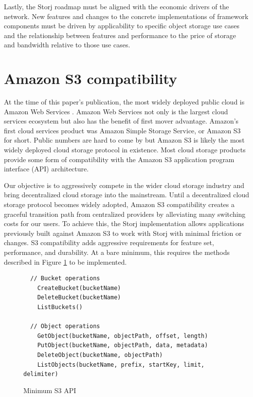 \documentclass[8pt,fleqn,openany]{book}
\begin{document}
Lastly, the Storj roadmap must be aligned with the economic drivers of the
network.
New features and changes to the concrete implementations of framework
components must be driven by applicability to specific object storage use cases
and the relationship between features and performance to the price of storage
and bandwidth relative to those use cases.

\section{Amazon S3 compatibility}\label{constraint-amazon}

At the time of this paper's publication, the most widely deployed public cloud
is Amazon Web Services \cite{aws-dominates}. Amazon Web Services not only
is the largest cloud services ecosystem but also has the benefit of first mover
advantage. Amazon's first cloud services product was Amazon Simple Storage
Service, or Amazon S3 for short. Public numbers are hard to come by but
Amazon S3 is likely the most widely deployed cloud storage protocol in existence.
Most cloud storage products provide some form of compatibility with the
Amazon S3 application program interface (API) architecture.

Our objective is to aggressively compete in the wider cloud
storage industry and bring decentralized cloud storage into the mainstream.
Until a decentralized cloud storage protocol becomes widely adopted,
Amazon S3 compatibility creates a graceful transition path from centralized
providers by alleviating many switching costs for our users.
To achieve this, the Storj implementation allows
applications previously built against Amazon S3 to work with Storj with
minimal friction or changes.
S3 compatibility adds aggressive requirements for feature set, performance, and
durability.
At a bare minimum, this requires the methods described in
Figure \ref{fig:s3-api-code} to be implemented.

\begin{figure}[!htbp]
\lstset{language=Golang}
\begin{lstlisting}
  // Bucket operations
	CreateBucket(bucketName)
	DeleteBucket(bucketName)
	ListBuckets()

  // Object operations
	GetObject(bucketName, objectPath, offset, length)
	PutObject(bucketName, objectPath, data, metadata)
	DeleteObject(bucketName, objectPath)
	ListObjects(bucketName, prefix, startKey, limit, delimiter)
\end{lstlisting}
\caption{Minimum S3 API}
\label{fig:s3-api-code}
\end{figure}
\end{document}
